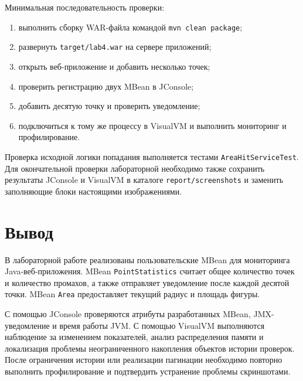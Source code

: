 \documentclass[a4paper,14pt]{extarticle}
\begin{document}
Минимальная последовательность проверки:
\begin{enumerate}
    \item выполнить сборку WAR-файла командой \texttt{mvn clean package};
    \item развернуть \texttt{target/lab4.war} на сервере приложений;
    \item открыть веб-приложение и добавить несколько точек;
    \item проверить регистрацию двух MBean в JConsole;
    \item добавить десятую точку и проверить уведомление;
    \item подключиться к тому же процессу в VisualVM и выполнить мониторинг и профилирование.
\end{enumerate}

Проверка исходной логики попадания выполняется тестами \texttt{AreaHitServiceTest}. Для окончательной проверки лабораторной необходимо также сохранить результаты JConsole и VisualVM в каталоге \texttt{report/screenshots} и заменить заполняющие блоки настоящими изображениями.

\section{Вывод}

В лабораторной работе реализованы пользовательские MBean для мониторинга Java-веб-приложения. MBean \texttt{PointStatistics} считает общее количество точек и количество промахов, а также отправляет уведомление после каждой десятой точки. MBean \texttt{Area} предоставляет текущий радиус и площадь фигуры.

С помощью JConsole проверяются атрибуты разработанных MBean, JMX-уведомление и время работы JVM. С помощью VisualVM выполняются наблюдение за изменением показателей, анализ распределения памяти и локализация проблемы неограниченного накопления объектов истории проверок. После ограничения истории или реализации пагинации необходимо повторно выполнить профилирование и подтвердить устранение проблемы скриншотами.
\end{document}
